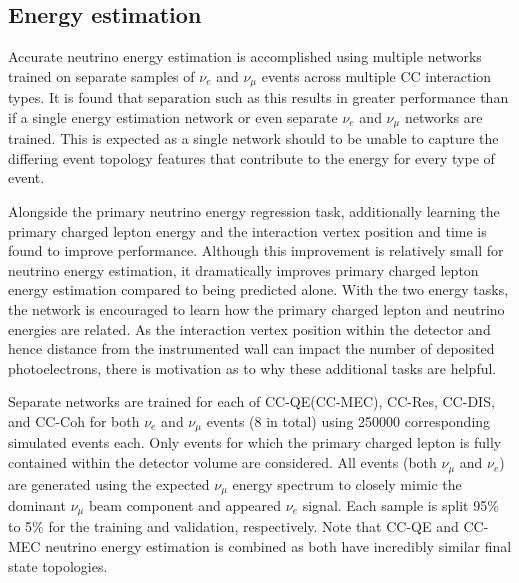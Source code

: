 \subsection{Energy estimation} %
\label{sec:cvn_specific_energy} %

Accurate neutrino energy estimation is accomplished using multiple networks trained on separate
samples of $\nu_{e}$ and $\nu_{\mu}$ events across multiple CC interaction types. It is found that
separation such as this results in greater performance than if a single energy estimation network
or even separate $\nu_{e}$ and $\nu_{\mu}$ networks are trained. This is expected as a single
network should to be unable to capture the differing event topology features that contribute to
the energy for every type of event.

Alongside the primary neutrino energy regression task, additionally learning the primary charged
lepton energy and the interaction vertex position and time is found to improve performance.
Although this improvement is relatively small for neutrino energy estimation, it dramatically
improves primary charged lepton energy estimation compared to being predicted alone. With the two
energy tasks, the network is encouraged to learn how the primary charged lepton and neutrino
energies are related. As the interaction vertex position within the detector and hence distance
from the instrumented wall can impact the number of deposited photoelectrons, there is motivation
as to why these additional tasks are helpful.

Separate networks are trained for each of CC-QE(CC-MEC), CC-Res, CC-DIS, and CC-Coh for both
$\nu_{e}$ and $\nu_{\mu}$ events (8 in total) using 250000 corresponding simulated events each.
Only events for which the primary charged lepton is fully contained within the detector volume are
considered. All events (both $\nu_{\mu}$ and $\nu_{e}$) are generated using the expected \chips
$\nu_{\mu}$ energy spectrum to closely mimic the dominant $\nu_{\mu}$ beam component and appeared
$\nu_{e}$ signal. Each sample is split 95\% to 5\% for the training and validation, respectively.
Note that CC-QE and CC-MEC neutrino energy estimation is combined as both have incredibly similar
final state topologies.

